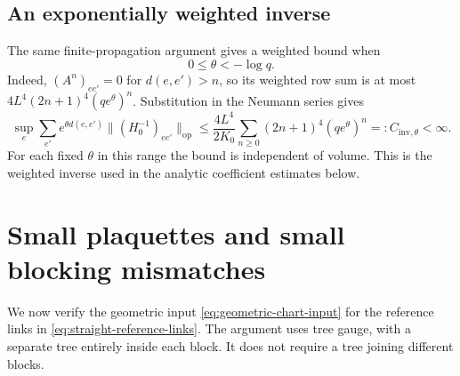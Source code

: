 \documentclass[10pt,reqno]{amsart}
\theoremstyle{definition}
\theoremstyle{remark}
\numberwithin{equation}{section}
\numberwithin{figure}{section}
\begin{document}
\subsection{An exponentially weighted inverse}
The same finite-propagation argument gives a weighted bound when
\begin{equation}\label{eq:analytic-weight-range}
0\le\theta<-\log q.
\end{equation}
Indeed, $(A^n)_{ee'}=0$ for $d(e,e')>n$, so its weighted row sum is at
most $4L^4(2n+1)^4(qe^\theta)^n$. Substitution in the Neumann series
gives
\begin{equation}\label{eq:weighted-inverse-row-sum}
\boxed{\sup_e\sum_{e'}e^{\theta d(e,e')}
\|(H_0^{-1})_{ee'}\|_{\mathrm{op}}
\le\frac{4L^4}{2K_0}\sum_{n\ge0}(2n+1)^4(qe^\theta)^n
=:C_{\mathrm{inv},\theta}<\infty.}
\end{equation}
For each fixed $\theta$ in this range the bound is independent of
volume. This is the weighted inverse used in the analytic
coefficient estimates below.

\section{Small plaquettes and small blocking mismatches}\label{sec:straight-chart-entry}
We now verify the geometric input \eqref{eq:geometric-chart-input} for
the reference links in \eqref{eq:straight-reference-links}. The argument
uses tree gauge, with a separate tree entirely inside each block.
It does not require a tree joining different blocks.
\end{document}
